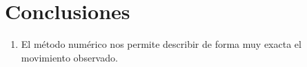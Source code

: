 \section{Conclusiones}

\begin{enumerate}
    \item El método numérico nos permite describir de forma 
        muy exacta el movimiento observado.
\end{enumerate}
